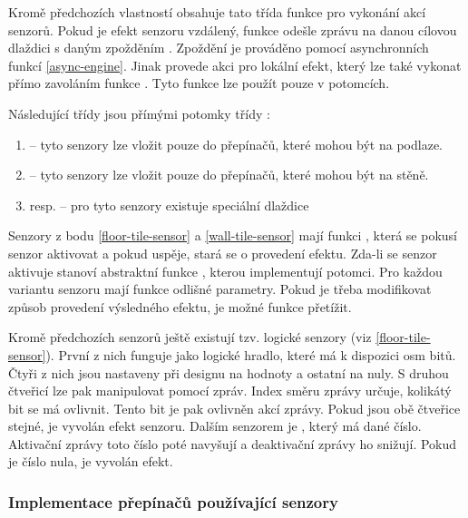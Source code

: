 Kromě předchozích vlastností obsahuje tato třída funkce pro vykonání akcí senzorů. Pokud je efekt senzoru vzdálený, funkce   odešle zprávu 
na danou cílovou dlaždici s daným zpožděním . Zpoždění je prováděno pomocí asynchronních funkcí \vref{async-engine}. Jinak provede akci pro lokální efekt, který lze 
také vykonat přímo zavoláním funkce . Tyto funkce lze použít pouze v potomcích.

Následující třídy jsou přímými potomky třídy :

\begin{enumerate}
\item\label{floor-tile-sensor}  -- tyto senzory lze vložit pouze do přepínačů, které mohou být na podlaze.
\item\label{wall-tile-sensor}  -- tyto senzory lze vložit pouze do přepínačů, které mohou být na stěně.
\item {} resp.  -- pro tyto senzory existuje speciální dlaždice 
\end{enumerate}

Senzory z bodu \ref{floor-tile-sensor} a \ref{wall-tile-sensor} mají funkci , která se pokusí senzor 
aktivovat a pokud uspěje, stará se o provedení efektu. Zda-li se senzor aktivuje stanoví abstraktní funkce ,
kterou implementují potomci. Pro každou variantu senzoru mají funkce odlišné parametry. Pokud je třeba modifikovat způsob 
provedení výsledného efektu, je možné funkce  přetížit.

Kromě předchozích senzorů ještě existují tzv. logické senzory (viz \ref{floor-tile-sensor}). První z nich  funguje 
jako logické hradlo, které má k dispozici osm bitů. Čtyři z nich jsou nastaveny při designu na hodnoty a ostatní na nuly. 
S druhou čtveřicí lze pak manipulovat pomocí zpráv. Index směru zprávy určuje, kolikátý bit se má ovlivnit. Tento bit
je pak ovlivněn akcí zprávy. Pokud jsou obě čtveřice stejné, je vyvolán efekt senzoru. Dalším
senzorem je , který má dané číslo. Aktivační zprávy toto číslo poté navyšují a deaktivační zprávy
ho snižují. Pokud je číslo  nula, je vyvolán efekt.
 
\subsubsection{Implementace přepínačů používající senzory}

